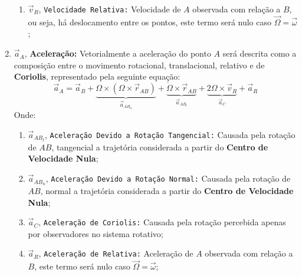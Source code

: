\documentclass{article}
\begin{document}
\begin{enumerate}[rightmargin = \leftmargin, noitemsep]
\begin{enumerate}[rightmargin = \leftmargin, noitemsep]
                            \item $\vec{v}_{R}$, \texttt{Velocidade Relativa:} Velocidade de $A$ observada com relação a $B$, ou seja, há deslocamento entre os pontos, este termo será nulo caso $\vec{\Omega} = \vec{\omega}$;
                        \end{enumerate}

                    \item $\vec{a}_{A}$, \textbf{Aceleração:} Vetorialmente a aceleração do ponto $A$ será descrita como a composição entre o movimento rotacional, translacional, relativo e de \textbf{Coriolis}, representado pela seguinte equação:
                        \begin{equation}
                            \boxed{
                                \vec{a}_{A} = 
                                \vec{a}_{B} + 
                                \underbrace{
                                    \Omega\times(\Omega\times\vec{r}_{AB})
                                }_{\vec{a}_{AB_{n}}} + 
                                \underbrace{
                                    \dot{\Omega}\times\vec{r}_{AB}
                                }_{\vec{a}_{AB_{t}}} + 
                                \underbrace{
                                    2\Omega\times\vec{v}_{R}
                                }_{\vec{a}_{C}} + 
                                \vec{a}_{R}
                            }
                        \end{equation}
                    Onde:
                        \begin{enumerate}[rightmargin = \leftmargin]
                            \item $\vec{a}_{AB_{t}}$, \texttt{Aceleração Devido a Rotação Tangencial:} Causada pela rotação de $AB$, tangencial a trajetória considerada a partir do \textbf{Centro de Velocidade Nula};

                            \item $\vec{a}_{AB_{n}}$, \texttt{Aceleração Devido a Rotação Normal:} Causada pela rotação de $AB$, normal a trajetória considerada a partir do \textbf{Centro de Velocidade Nula};

                            \item $\vec{a}_{C}$, \texttt{Aceleração de Coriolis:} Causada pela rotação percebida apenas por observadores no sistema rotativo;

                            \item $\vec{a}_{R}$, \texttt{Aceleração de Relativa:} Aceleração de $A$ observada com relação a $B$, este termo será nulo caso $\vec{\Omega} = \vec{\omega}$;
                        \end{enumerate}
                \end{enumerate}
\newpage
\end{document}

